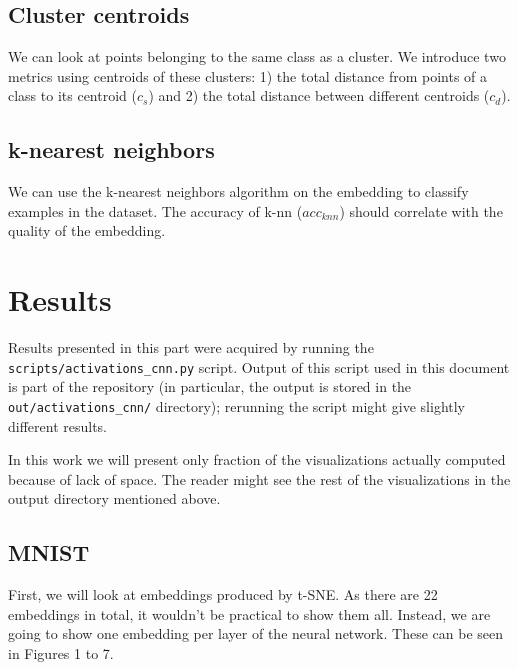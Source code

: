 \documentclass{article}
\begin{document}
\subsection{Cluster centroids}
We can look at points belonging to the same class as a cluster. We introduce
two metrics using centroids of these clusters: 1) the total distance from 
points of a class to its centroid (\(c_s\)) and 2) the total distance between
different centroids (\(c_d\)).

\subsection{k-nearest neighbors}
We can use the k-nearest neighbors algorithm on the embedding to classify
examples in the dataset. The accuracy of k-nn (\(acc_{knn}\)) should
correlate with the quality of the embedding.

\section{Results}
Results presented in this part were acquired by running the
\texttt{\\ scripts/activations\_cnn.py} script. Output of this script
used in this document is part of the repository (in particular, the output
is stored in the \texttt{\\ out/activations\_cnn/} directory); rerunning
the script might give slightly different results.

In this work we will present only fraction of the visualizations actually
computed because of lack of space. The reader might see the rest of the
visualizations in the output directory mentioned above.

\subsection{MNIST}
First, we will look at embeddings produced by t-SNE. As there are 22
embeddings in total, it wouldn't be practical to show them all. Instead,
we are going to show one embedding per layer of the neural network. These
can be seen in Figures 1 to 7.
\end{document}
